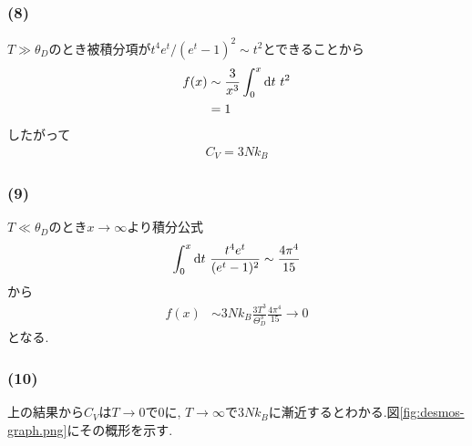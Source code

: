 \subsubsection*{(8)}
$T\gg\theta_D$のとき被積分項が$t^4e^t/(e^t-1)^2\sim t^2$とできることから
\begin{align}
  f(x)&\sim\frac{3}{x^3}\int_0^x{\rm d}t\ t^2\nonumber\\
  &=1
\end{align}
したがって
\begin{align}
  C_V=3Nk_B
\end{align}
\subsubsection*{(9)}
$T\ll\theta_D$のとき$x\rightarrow\infty$より積分公式
\begin{align}
  \int_0^x{\rm d}t\ \frac{t^4e^t}{(e^t-1)^2}\sim\frac{4\pi^4}{15}
\end{align}
から
\begin{align}
  f(x)&\sim 3Nk_B\frac{3T^3}{\Theta_D^3}\frac{4\pi^4}{15}
  \rightarrow 0
\end{align}
となる.
\subsubsection*{(10)}
上の結果から$C_V$は$T\rightarrow0$で$0$に, $T\rightarrow\infty$で$3Nk_B$に漸近するとわかる.図\ref{fig:desmos-graph.png}にその概形を示す.

